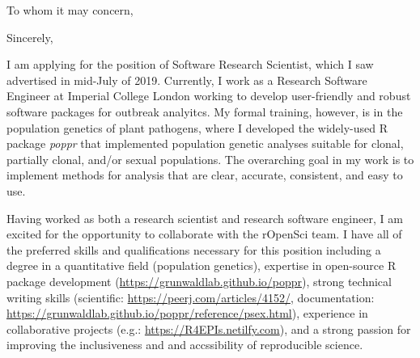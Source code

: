


\clearpage

\date{\today} %
\opening{To whom it may concern,} %
\closing{Sincerely,} %

\makelettertitle %

I am applying for the position of Software Research Scientist, which I saw 
advertised in mid-July of 2019. Currently, I work as a Research Software
Engineer at Imperial College London working to develop user-friendly and robust
software packages for outbreak analyitcs. My formal training, however, is in
the population genetics of plant pathogens, where I developed the widely-used
R package \textit{poppr} that implemented population genetic analyses suitable
for clonal, partially clonal, and/or sexual populations. The overarching goal in
my work is to implement methods for analysis that are clear, accurate,
consistent, and easy to use.

Having worked as both a research scientist and research software engineer, I am
excited for the opportunity to collaborate with the rOpenSci team. I have all of
the preferred skills and qualifications necessary for this position including
a degree in a quantitative field (population genetics), expertise in open-source
R package development (\url{https://grunwaldlab.github.io/poppr}), strong
technical writing skills (scientific: \url{https://peerj.com/articles/4152/}, 
documentation: \url{https://grunwaldlab.github.io/poppr/reference/psex.html}), 
experience in collaborative projects (e.g.: \url{https://R4EPIs.netilfy.com}),
and a strong passion for improving the inclusiveness and and accssibility of
reproducible science. 





